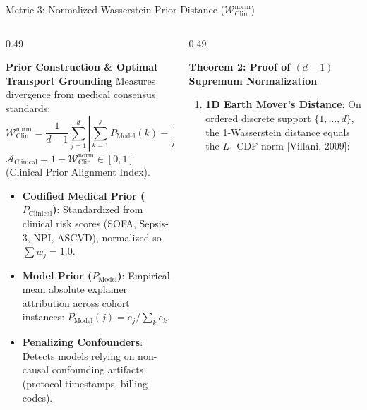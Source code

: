 \documentclass[aspectratio=169,10pt]{beamer}
\begin{document}
\begin{frame}{Metric 3: Normalized Wasserstein Prior Distance ($\mathcal{W}_{\text{Clin}}^{\text{norm}}$)}
  \vspace{-0.15cm}
  \begin{columns}[t]
    \begin{column}{0.49\textwidth}
      \begin{block}{\textbf{Prior Construction \& Optimal Transport Grounding}}
        \scriptsize
        Measures divergence from medical consensus standards:
        \vspace{1pt}
        {\footnotesize $$\mathcal{W}_{\text{Clin}}^{\text{norm}} = \frac{1}{d - 1} \sum_{j=1}^{d} \left| \sum_{k=1}^{j} P_{\text{Model}}(k) - \sum_{k=1}^{j} P_{\text{Clinical}}(k) \right|$$}
        \vspace{-3pt}
        $\mathcal{A}_{\text{Clinical}} = 1 - \mathcal{W}_{\text{Clin}}^{\text{norm}} \in [0, 1]$ (Clinical Prior Alignment Index).
        \vspace{1pt}
        \begin{itemize}\setlength\itemsep{1pt}
          \item \textbf{Codified Medical Prior ($P_{\text{Clinical}}$)}: Standardized from clinical risk scores (SOFA, Sepsis-3, NPI, ASCVD), normalized so $\sum w_j = 1.0$.
          \item \textbf{Model Prior ($P_{\text{Model}}$)}: Empirical mean absolute explainer attribution across cohort instances: $P_{\text{Model}}(j) = \bar{e}_j / \sum_k \bar{e}_k$.
          \item \textbf{Penalizing Confounders}: Detects models relying on non-causal confounding artifacts (protocol timestamps, billing codes).
        \end{itemize}
      \end{block}
    \end{column}
    \begin{column}{0.49\textwidth}
      \begin{exampleblock}{\textbf{Theorem 2: Proof of $(d - 1)$ Supremum Normalization}}
        \scriptsize
        \begin{enumerate}\setlength\itemsep{1pt}
          \item \textbf{1D Earth Mover's Distance}: On ordered discrete support $\{1, \dots, d\}$, the 1-Wasserstein distance equals the $L_1$ CDF norm [Villani, 2009]:

\end{enumerate}
\end{exampleblock}
\end{column}
\end{columns}
\end{frame}
\end{document}
